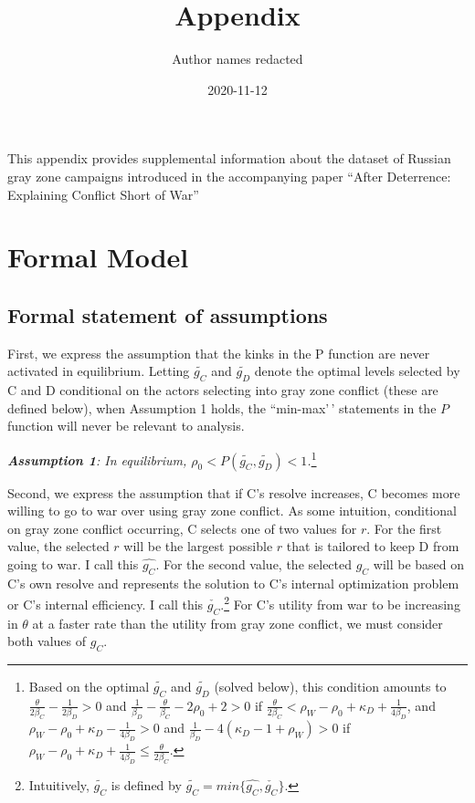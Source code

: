 \documentclass[
]{article}
\title{Appendix}
\author{Author names redacted}
\date{2020-11-12}
\begin{document}
\maketitle

{
\setcounter{tocdepth}{5}
\tableofcontents
}
This appendix provides supplemental information about the dataset of
Russian gray zone campaigns introduced in the accompanying paper ``After
Deterrence: Explaining Conflict Short of War''

\hypertarget{formal-model}{%
\section{Formal Model}\label{formal-model}}

\hypertarget{formal-statement-of-assumptions}{%
\subsection{Formal statement of
assumptions}\label{formal-statement-of-assumptions}}

First, we express the assumption that the kinks in the P function are
never activated in equilibrium. Letting \(\tilde{g_{C}}\) and
\(\tilde{g_{D}}\) denote the optimal levels selected by C and D
conditional on the actors selecting into gray zone conflict (these are
defined below), when Assumption 1 holds, the ``min-max'\,' statements in
the \(P\) function will never be relevant to analysis.

\textbf{\textit{Assumption 1}}\textit{: In equilibrium, $\rho_{0}<P(\tilde{g_{C}},\tilde{g_{D}})<1$.}\footnote{Based on the optimal $\tilde{g_{C}}$ and $\tilde{g_{D}}$ (solved below), this condition amounts to $\frac{\theta}{2\beta_{C}}-\frac{1}{2\beta_{D}}>0$ and $\frac{1}{\beta_{D}}-\frac{\theta}{\beta_{C}}-2\rho_{0}+2>0$ if $\frac{\theta}{2\beta_{C}}<\rho_{W}-\rho_{0}+\kappa_{D}+\frac{1}{4\beta_{D}}$, and $\rho_{W}-\rho_{0}+\kappa_{D}-\frac{1}{4\beta_{D}}>0$ and $\frac{1}{\beta_{D}}-4\left(\kappa_{D}-1+\rho_{W}\right)>0$ if $\rho_{W}-\rho_{0}+\kappa_{D}+\frac{1}{4\beta_{D}}\leq\frac{\theta}{2\beta_{C}}$.}

Second, we express the assumption that if C's resolve increases, C
becomes more willing to go to war over using gray zone conflict. As some
intuition, conditional on gray zone conflict occurring, C selects one of
two values for \(r\). For the first value, the selected \(r\) will be
the largest possible \(r\) that is tailored to keep D from going to war.
I call this \(\hat{g_{C}}\). For the second value, the selected
\(g_{C}\) will be based on C's own resolve and represents the solution
to C's internal optimization problem or C's internal efficiency. I call
this
\(\check{g_{C}}\).\footnote{Intuitively, $\tilde{g_{C}}$ is defined by $\tilde{g_{C}}=min\{\hat{g_{C}},\check{g_{C}}\}$.}
For C's utility from war to be increasing in \(\theta\) at a faster rate
than the utility from gray zone conflict, we must consider both values
of \(g_{C}\).
\end{document}
